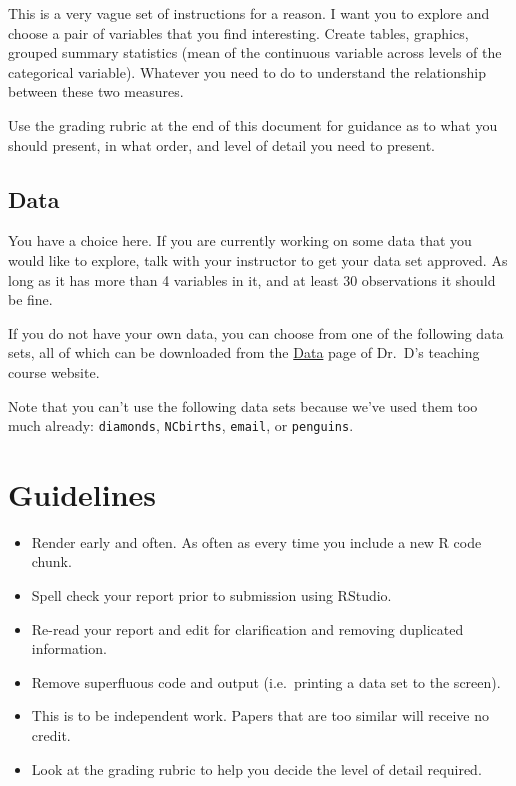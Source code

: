 \documentclass[
  letterpaper,
  DIV=11,
  numbers=noendperiod,
  oneside]{scrreprt}
\providecommand{\tightlist}{%
  \setlength{\itemsep}{0pt}\setlength{\parskip}{0pt}}\usepackage{longtable,booktabs,array}
\begin{document}
This is a very vague set of instructions for a reason. I want you to
explore and choose a pair of variables that you find interesting. Create
tables, graphics, grouped summary statistics (mean of the continuous
variable across levels of the categorical variable). Whatever you need
to do to understand the relationship between these two measures.

Use the grading rubric at the end of this document for guidance as to
what you should present, in what order, and level of detail you need to
present.

\section*{Data}\label{data}


You have a choice here. If you are currently working on some data that
you would like to explore, talk with your instructor to get your data
set approved. As long as it has more than 4 variables in it, and at
least 30 observations it should be fine.

If you do not have your own data, you can choose from one of the
following data sets, all of which can be downloaded from the
\href{https://www.norcalbiostat.com/data/}{Data} page of Dr.~D's
teaching course website.

Note that you can't use the following data sets because we've used them
too much already: \texttt{diamonds}, \texttt{NCbirths}, \texttt{email},
or \texttt{penguins}.

\chapter*{Guidelines}\label{guidelines}


\begin{itemize}
\tightlist
\item
  Render early and often. As often as every time you include a new R
  code chunk.
\item
  Spell check your report prior to submission using RStudio.
\item
  Re-read your report and edit for clarification and removing duplicated
  information.
\item
  Remove superfluous code and output (i.e.~printing a data set to the
  screen).
\item
  This is to be independent work. Papers that are too similar will
  receive no credit.
\item
  Look at the grading rubric to help you decide the level of detail
  required.
\end{itemize}
\end{document}
